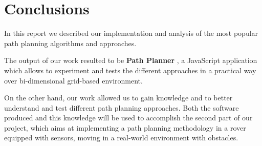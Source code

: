 \documentclass[conference]{IEEEtran}
\begin{document}
\section{Conclusions}
In this report we described our implementation and analysis of the most popular path planning algorithms and approaches.

The output of our work resulted to be \textbf{Path Planner} \cite{Path-Planner}, a JavaScript application which allows to experiment and tests the different approaches in a practical way over bi-dimensional grid-based environment.

On the other hand, our work allowed us to gain knowledge and to better understand and test different path planning approaches. Both the software produced and this knowledge will be used to accomplish the second part of our project, which aims at implementing a path planning methodology in a rover equipped with sensors, moving in a real-world environment with obstacles.



\end{document}
